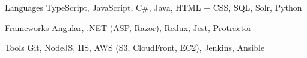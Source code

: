 

\begin{cvskills}

  \cvskill
    {Languages} %
    {TypeScript, JavaScript, C\#, Java, HTML + CSS, SQL, Solr, Python } %

  \cvskill
    {Frameworks} %
    {Angular, .NET (ASP, Razor), Redux, Jest, Protractor} %

  \cvskill
    {Tools} %
    {Git, NodeJS, IIS, AWS (S3, CloudFront, EC2), Jenkins, Ansible} %

\end{cvskills}
